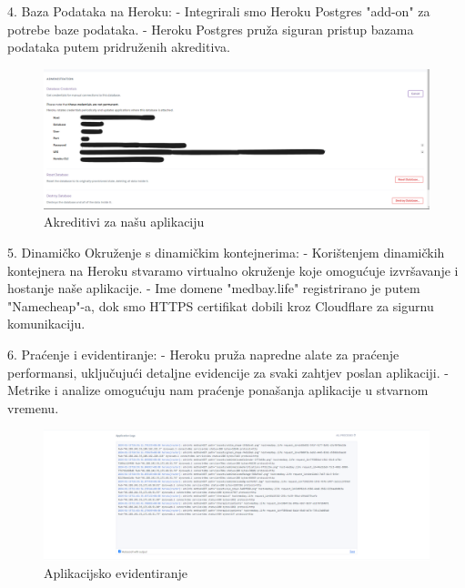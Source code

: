 4. Baza Podataka na Heroku:
\newline- Integrirali smo Heroku Postgres "add-on" za potrebe baze podataka.
\newline- Heroku Postgres pruža siguran pristup bazama podataka putem pridruženih akreditiva.
   \begin{figure}[H]
       \centering
       \includegraphics[width=1\linewidth]{slike/credentials.png}
       \caption{Akreditivi za našu aplikaciju}
       \label{fig:enter-label}
   \end{figure}

5. Dinamičko Okruženje s  dinamičkim kontejnerima:
\newline- Korištenjem dinamičkih kontejnera na Heroku stvaramo virtualno okruženje koje omogućuje izvršavanje i hostanje naše aplikacije.
\newline- Ime domene "medbay.life" registrirano je putem "Namecheap"-a, dok smo HTTPS certifikat dobili kroz Cloudflare za sigurnu komunikaciju.

6. Praćenje i evidentiranje:
\newline- Heroku pruža napredne alate za praćenje performansi, uključujući detaljne evidencije za svaki zahtjev poslan aplikaciji.
\newline- Metrike i analize omogućuju nam praćenje ponašanja aplikacije u stvarnom vremenu.
   \begin{figure}[H]
       \centering
       \includegraphics[width=1\linewidth]{slike/appLogs.png}
       \caption{Aplikacijsko evidentiranje}
       \label{fig:enter-label}
   \end{figure}



